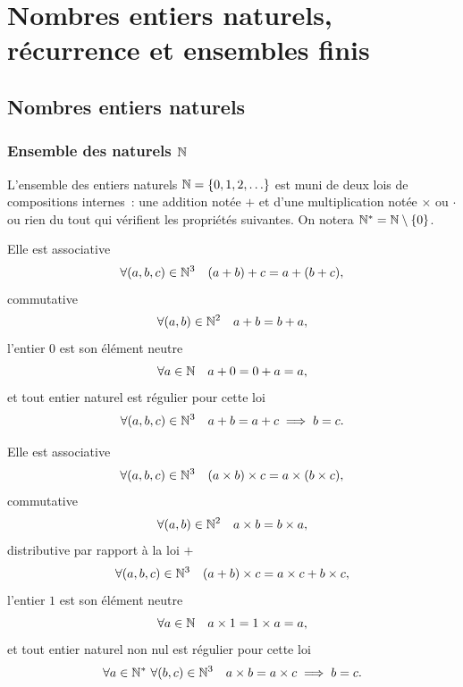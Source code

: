 \chapter{Nombres entiers naturels, récurrence et ensembles finis}
\minitoc
\minilof
\minilot
\label{chap:naturels}
\section{Nombres entiers naturels}

\subsection{Ensemble des naturels \(\mathbb{N}\)}

L'ensemble des entiers naturels \(\mathbb{N} = \{0, 1, 2, \ldots\}\) est muni de deux lois de 
compositions internes~: une addition notée \(+\) et d'une multiplication notée 
\(\times\) ou \(\cdot\) ou rien du tout qui vérifient les propriétés suivantes.  
On notera \(\mathbb{N}^*=\mathbb{N}\setminus\{0\}\).

\begin{prop}[Loi \(+\)]
  Elle est associative \begin{equation}
    \forall (a, b, c) \in \mathbb{N}^3 \quad (a + b) + c = a + (b + c),
  \end{equation}
  commutative
  \begin{equation}
    \forall (a, b) \in \mathbb{N}^2 \quad a + b = b + a,
  \end{equation}
  l'entier \(0\) est son élément neutre
  \begin{equation}
    \forall a \in \mathbb{N} \quad a + 0 = 0 + a = a,
  \end{equation}
  et tout entier naturel est régulier pour cette loi
  \begin{equation}
    \forall (a, b, c) \in \mathbb{N}^3 \quad a + b = a + c \implies b = c.
  \end{equation}
\end{prop}

\begin{prop}
  Elle est associative \begin{equation}
    \forall (a, b, c) \in \mathbb{N}^3 \quad (a\times b)\times c = a\times (b\times c),
  \end{equation}
  commutative
  \begin{equation}
    \forall (a, b) \in \mathbb{N}^2 \quad a\times b = b\times a,
  \end{equation}
  distributive par rapport à la loi \(+\)
  \begin{equation}
    \forall (a, b, c) \in \mathbb{N}^3 \quad (a + b)\times c = a\times c + b\times c,
  \end{equation}
  l'entier \(1\) est son élément neutre
  \begin{equation}
    \forall a \in \mathbb{N} \quad a\times 1 = 1\times a = a,
  \end{equation}
  et tout entier naturel non nul est régulier pour cette loi
  \begin{equation}
    \forall a \in \mathbb{N}^* \ \forall (b, c) \in \mathbb{N}^3 \quad a\times b = a\times c 
    \implies b = c.
  \end{equation}
\end{prop}

